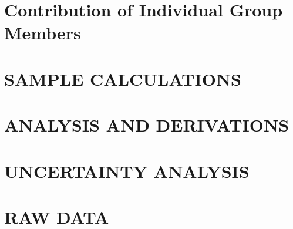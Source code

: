 \documentclass[12pt]{article}
\begin{document}
\section{Contribution of Individual Group Members} \label{sec:9}


\clearpage
\begin{alphasection}
    \section{SAMPLE CALCULATIONS}\label{sec:A}
    
    
    \section{ANALYSIS AND DERIVATIONS}\label{sec:B}
    
    
    \section{UNCERTAINTY ANALYSIS}\label{sec:C}
    
    
    \section{RAW DATA} \label{sec:D}
    
    
\end{alphasection}











\end{document}
